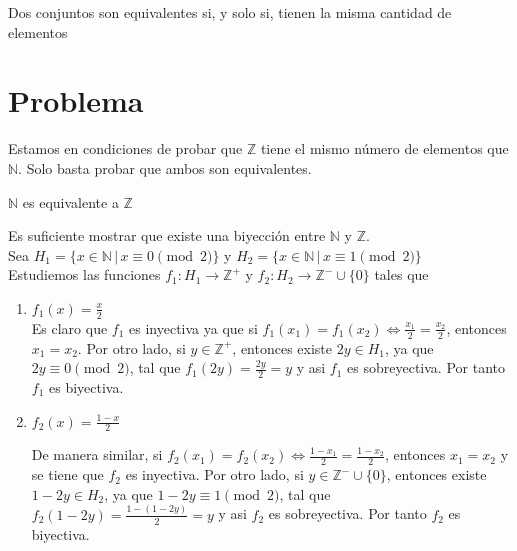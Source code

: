 \documentclass[letterpaper, 12pt]{article} %
\begin{document}
\begin{observation}
Dos conjuntos son equivalentes si, y solo si, tienen la misma cantidad de elementos
\end{observation}

\section{Problema}
Estamos en condiciones de probar que $\mathbb{Z}$ tiene el mismo número de elementos que $\mathbb{N}$.
Solo basta probar que ambos son equivalentes.

\begin{lemma}
$\mathbb{N}$ es equivalente a $\mathbb{Z}$
\end{lemma}

\begin{Proof}
Es suficiente mostrar que existe una biyección entre $\mathbb{N}$ y $\mathbb{Z}$.\\

Sea $H_{1} = \{x \in \mathbb{N} \, | \, x \equiv 0 \pmod{2} \}$ y
$H_{2} = \{x \in \mathbb{N} \, | \, x \equiv 1 \pmod{2} \}$\\

Estudiemos las funciones $f_{1} : H_{1} \longrightarrow \mathbb{Z}^{+}$ y $f_{2} : H_{2} \longrightarrow  \mathbb{Z}^{-}\cup \{0\}$
tales que

\begin{enumerate}
\item $f_{1}(x) = \frac{x}{2}$\\

Es claro que $f_{1}$ es inyectiva ya que si $f_{1}(x_{1}) = f_{1}(x_{2}) \Leftrightarrow \frac{x_{1}}{2} = \frac{x_{2}}{2}$,
 entonces $x_{1} = x_{2}$. Por otro lado, si $y \in \mathbb{Z}^{+}$, entonces existe $2y \in H_{1}$, ya que
 $2y \equiv 0 \pmod{2}$, tal que $f_{1}(2y) = \frac{2y}{2} = y$ y asi $f_{1}$ es sobreyectiva. Por
 tanto $f_{1}$ es biyectiva.

\item $f_{2}(x) = \frac{1-x}{2}$

De manera similar, si $f_{2}(x_{1}) = f_{2}(x_{2}) \Leftrightarrow \frac{1- x_{1}}{2} = \frac{1-x_{2}}{2}$,
 entonces $x_{1} = x_{2}$ y se tiene que $f_{2}$ es inyectiva. Por otro lado, si $y \in \mathbb{Z}^{-}\cup \{0\}$, entonces existe $1-2y \in H_{2}$, ya que
 $1-2y \equiv 1 \pmod{2}$, tal que $f_{2}(1-2y) = \frac{1-(1-2y)}{2} = y$ y asi $f_{2}$ es sobreyectiva. Por
 tanto $f_{2}$ es biyectiva.
\end{enumerate}


\end{Proof}
\end{document}
